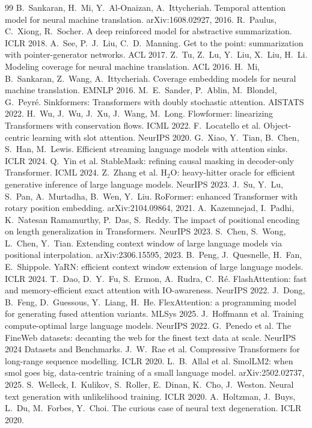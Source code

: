 \documentclass[11pt]{article}
\begin{document}
\begin{thebibliography}{99}\small
{} B.~Sankaran, H.~Mi, Y.~Al-Onaizan, A.~Ittycheriah. Temporal attention model for neural machine translation. arXiv:1608.02927, 2016.
 R.~Paulus, C.~Xiong, R.~Socher. A deep reinforced model for abstractive summarization. ICLR 2018.
 A.~See, P.~J.~Liu, C.~D.~Manning. Get to the point: summarization with pointer-generator networks. ACL 2017.
 Z.~Tu, Z.~Lu, Y.~Liu, X.~Liu, H.~Li. Modeling coverage for neural machine translation. ACL 2016.
 H.~Mi, B.~Sankaran, Z.~Wang, A.~Ittycheriah. Coverage embedding models for neural machine translation. EMNLP 2016.
 M.~E.~Sander, P.~Ablin, M.~Blondel, G.~Peyr\'e. Sinkformers: Transformers with doubly stochastic attention. AISTATS 2022.
 H.~Wu, J.~Wu, J.~Xu, J.~Wang, M.~Long. Flowformer: linearizing Transformers with conservation flows. ICML 2022.
 F.~Locatello et al. Object-centric learning with slot attention. NeurIPS 2020.
 G.~Xiao, Y.~Tian, B.~Chen, S.~Han, M.~Lewis. Efficient streaming language models with attention sinks. ICLR 2024.
 Q.~Yin et al. StableMask: refining causal masking in decoder-only Transformer. ICML 2024.
 Z.~Zhang et al. H$_2$O: heavy-hitter oracle for efficient generative inference of large language models. NeurIPS 2023.
 J.~Su, Y.~Lu, S.~Pan, A.~Murtadha, B.~Wen, Y.~Liu. RoFormer: enhanced Transformer with rotary position embedding. arXiv:2104.09864, 2021.
 A.~Kazemnejad, I.~Padhi, K.~Natesan Ramamurthy, P.~Das, S.~Reddy. The impact of positional encoding on length generalization in Transformers. NeurIPS 2023.
 S.~Chen, S.~Wong, L.~Chen, Y.~Tian. Extending context window of large language models via positional interpolation. arXiv:2306.15595, 2023.
 B.~Peng, J.~Quesnelle, H.~Fan, E.~Shippole. YaRN: efficient context window extension of large language models. ICLR 2024.
 T.~Dao, D.~Y.~Fu, S.~Ermon, A.~Rudra, C.~R\'e. FlashAttention: fast and memory-efficient exact attention with IO-awareness. NeurIPS 2022.
 J.~Dong, B.~Feng, D.~Guessous, Y.~Liang, H.~He. FlexAttention: a programming model for generating fused attention variants. MLSys 2025.
 J.~Hoffmann et al. Training compute-optimal large language models. NeurIPS 2022.
 G.~Penedo et al. The FineWeb datasets: decanting the web for the finest text data at scale. NeurIPS 2024 Datasets and Benchmarks.
 J.~W.~Rae et al. Compressive Transformers for long-range sequence modelling. ICLR 2020.
 L.~B.~Allal et al. SmolLM2: when smol goes big, data-centric training of a small language model. arXiv:2502.02737, 2025.
 S.~Welleck, I.~Kulikov, S.~Roller, E.~Dinan, K.~Cho, J.~Weston. Neural text generation with unlikelihood training. ICLR 2020.
 A.~Holtzman, J.~Buys, L.~Du, M.~Forbes, Y.~Choi. The curious case of neural text degeneration. ICLR 2020.
\end{thebibliography}
\end{document}
